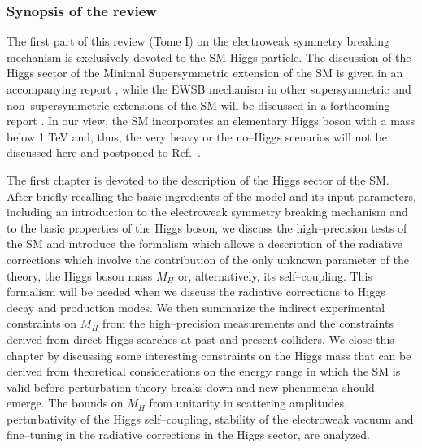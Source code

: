 \subsubsection*{Synopsis of the review}

The first part of this review (Tome I) on the electroweak symmetry breaking
mechanism is exclusively devoted to the SM Higgs particle. The discussion
of the Higgs sector of the Minimal Supersymmetric extension of the SM is 
given in an accompanying report \cite{Tome2}, while the EWSB mechanism in other
supersymmetric and non--supersymmetric extensions of the SM will be discussed
in a forthcoming report \cite{Tome3}. In our view, the SM incorporates an
elementary Higgs boson with a mass below 1 TeV and, thus, the very heavy or the
no--Higgs scenarios will not be discussed here and postponed to
Ref.~\cite{Tome3}.\s 

The first chapter is devoted to the description of the Higgs sector of the SM. 
After briefly recalling the basic ingredients of the model and its input
parameters, including an introduction to the electroweak symmetry breaking
mechanism and to the basic properties of the Higgs boson, we discuss the
high--precision tests of the SM and introduce the formalism which allows a
description of the radiative corrections which involve the contribution of the
only unknown parameter of the theory, the Higgs boson mass $M_H$ or,
alternatively, its self--coupling. This formalism will be needed when we
discuss the radiative corrections to Higgs decay and production modes. We then
summarize the indirect experimental constraints on $M_H$ from the
high--precision measurements and the constraints derived from direct Higgs
searches at past and present colliders. We close this chapter by discussing
some interesting constraints on the Higgs mass that can be derived from
theoretical considerations on the energy range in which the SM is valid before
perturbation theory breaks down and new phenomena should emerge.  The bounds on
$M_H$ from unitarity in scattering amplitudes, perturbativity of the Higgs
self--coupling, stability of the electroweak vacuum and fine--tuning in the
radiative corrections in the Higgs sector, are analyzed. \s

